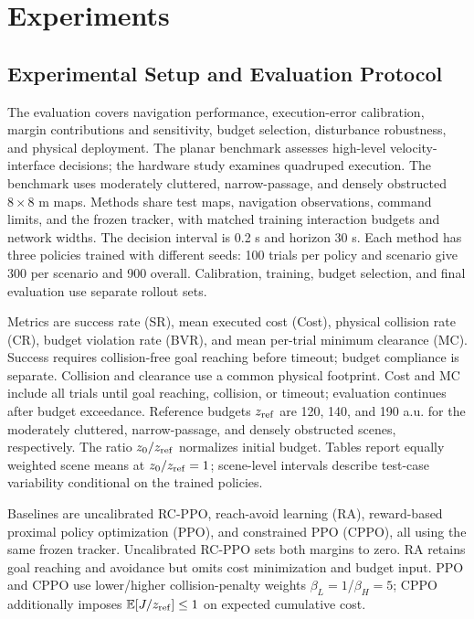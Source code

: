 \documentclass[conference]{IEEEtran}
\begin{document}
\section{Experiments}
\subsection{Experimental Setup and Evaluation Protocol}
\label{sec:experimental_setup}
The evaluation covers navigation performance, execution-error calibration, margin
contributions and sensitivity, budget selection, disturbance robustness, and
physical deployment. The planar benchmark assesses high-level velocity-interface
decisions; the hardware study examines quadruped execution.
The benchmark uses moderately cluttered, narrow-passage, and densely obstructed
$8\times8$ m maps. Methods share test maps, navigation observations, command
limits, and the frozen tracker, with matched training interaction budgets and network
widths. The decision interval is 0.2 s and horizon 30 s. Each method has three
policies trained with different seeds: 100 trials per policy and scenario give
300 per scenario and 900 overall. Calibration, training, budget selection, and
final evaluation use separate rollout sets.

Metrics are success rate (SR), mean executed cost (Cost), physical collision rate
(CR), budget violation rate (BVR), and mean per-trial minimum clearance (MC).
Success requires collision-free goal reaching before timeout; budget compliance
is separate. Collision and clearance use a common physical footprint. Cost and
MC include all trials until goal reaching, collision, or timeout; evaluation
continues after budget exceedance. Reference budgets $z_{\rm ref}$ are 120, 140,
and 190 a.u. for the moderately cluttered, narrow-passage, and densely obstructed
scenes, respectively. The ratio $z_0/z_{\rm ref}$ normalizes initial budget.
Tables report equally weighted scene means at $z_0/z_{\rm ref}=1$; scene-level
intervals describe test-case variability conditional on the trained policies.

Baselines are uncalibrated RC-PPO, reach-avoid learning (RA), reward-based proximal
policy optimization (PPO), and constrained PPO (CPPO), all using the same frozen
tracker. Uncalibrated RC-PPO sets both margins to zero. RA retains goal reaching and avoidance
but omits cost minimization and budget input. PPO and CPPO use lower/higher
collision-penalty weights $\beta_L=1$/$\beta_H=5$; CPPO additionally imposes
$\mathbb{E}[J/z_{\rm ref}]\leq1$ on expected cumulative cost.
\end{document}
